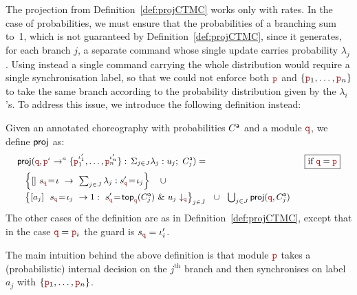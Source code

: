 The projection from Definition~\ref{def:projCTMC} works only with
rates. In the case of probabilities, we must ensure that the
probabilities of a branching sum to~1, which is not guaranteed by
Definition~\ref{def:projCTMC}, since it generates, for each branch
$j$, a separate command whose single update carries probability
$\lambda_j$. Using instead a single command carrying the whole
distribution would require a single synchronisation label, so that we
could not enforce both $\nr$ and $\{\nr_1,\ldots,\nr_n\}$ to take the
same branch according to the probability distribution given by the
\(\lambda_i\)’s. To address this issue, we introduce the following
definition instead:
\begin{defi}\label{def:projDTMC} Given
  an annotated choreography with probabilities ${C}^{\mathsf a}$ and a module
  $\nrr$, we define $\mathsf{proj}$ as:
  \begin{displaymath}\small
    \begin{array}{lr}
      \proj
      (\nrr,\interactl{\nr^\iota}a{\nr_1^{\iota_1'},\ldots,\nr_n^{\iota_n'}})= 
      &  \boxed{\text{if }\nrr=\nr}\\[2mm]
      \
      \begin{array}{lll}
        \left\{\commandBase {} {s_{\nrr}\!=\! \iota}{\ \sum_{j\in J}
        \lambda_j: s'_{\nrr}\!=\! \iota_j}\right\}\quad\cup\\[2mm]
        \left\{\commandBase {a_j} {\ s_{\nrr}\!=\! \iota_j} {1:}
        \ s_{\nrr}'\!=\! \mathsf{top}_{\nrr}(\anno C_j)\
        \&\ \projE {u_j}\nrr\right\}_{j\in J}
        \ \ \cup\ \ \bigcup_{j\in J} \proj (\nrr, \anno C_j)
      \end{array}
    \end{array}
  \end{displaymath}
  The other cases of the definition are as in
  Definition~\ref{def:projCTMC}, except that in the case $\nrr=\nr_i$
  the guard is $s_{\nrr}=\iota_i'$.
\end{defi}
The main intuition behind the above definition is that module $\nr$
takes a (probabilistic) internal decision on the $j^{\text{th}}$
branch and then synchronises on label $a_j$ with
$\{\nr_1,\ldots,\nr_n\}$.

\smallskip

